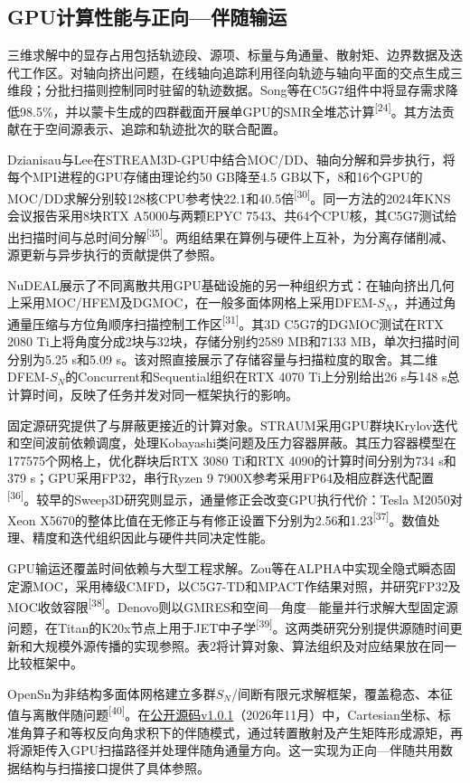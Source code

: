 \documentclass[UTF8, zihao=-4, fontset=none, a4paper]{ctexart}
\newcommand{\upcite}[1]{\textsuperscript{[#1]}}
\begin{document}
\subsection{GPU计算性能与正向---伴随输运}

三维求解中的显存占用包括轨迹段、源项、标量与角通量、散射矩、边界数据及迭代工作区。对轴向挤出问题，在线轴向追踪利用径向轨迹与轴向平面的交点生成三维段；分批扫描则控制同时驻留的轨迹数据。Song等在C5G7组件中将显存需求降低98.5\%，并以蒙卡生成的四群截面开展单GPU的SMR全堆芯计算\upcite{24}。其方法贡献在于空间源表示、追踪和轨迹批次的联合配置。

Dzianisau与Lee在STREAM3D-GPU中结合MOC/DD、轴向分解和异步执行，将每个MPI进程的GPU存储由理论约50 GB降至4.5 GB以下，8和16个GPU的MOC/DD求解分别较128核CPU参考快22.1和40.5倍\upcite{30}。同一方法的2024年KNS会议报告采用8块RTX A5000与两颗EPYC 7543、共64个CPU核，其C5G7测试给出扫描时间与总时间分解\upcite{35}。两组结果在算例与硬件上互补，为分离存储削减、源更新与异步执行的贡献提供了参照。

NuDEAL展示了不同离散共用GPU基础设施的另一种组织方式：在轴向挤出几何上采用MOC/HFEM及DGMOC，在一般多面体网格上采用DFEM-\(S_{N}\)，并通过角通量压缩与方位角顺序扫描控制工作区\upcite{31}。其3D C5G7的DGMOC测试在RTX 2080 Ti上将角度分成2块与32块，存储分别约2589 MB和7133 MB，单次扫描时间分别为5.25 s和5.09 s。该对照直接展示了存储容量与扫描粒度的取舍。其二维DFEM-\(S_{N}\)的Concurrent和Sequential组织在RTX 4070 Ti上分别给出26 s与148 s总计算时间，反映了任务并发对同一框架执行的影响。

固定源研究提供了与屏蔽更接近的计算对象。STRAUM采用GPU群块Krylov迭代和空间波前依赖调度，处理Kobayashi类问题及压力容器屏蔽。其压力容器模型在177575个网格上，优化群块后RTX 3080 Ti和RTX 4090的计算时间分别为734 s和379 s；GPU采用FP32，串行Ryzen 9 7900X参考采用FP64及相应群迭代配置\upcite{36}。较早的Sweep3D研究则显示，通量修正会改变GPU执行代价：Tesla M2050对Xeon X5670的整体比值在无修正与有修正设置下分别为2.56和1.23\upcite{37}。数值处理、精度和迭代组织因此与硬件共同决定性能。

GPU输运还覆盖时间依赖与大型工程求解。Zou等在ALPHA中实现全隐式瞬态固定源MOC，采用棒级CMFD，以C5G7-TD和MPACT作结果对照，并研究FP32及MOC收敛容限\upcite{38}。Denovo则以GMRES和空间---角度---能量并行求解大型固定源问题，在Titan的K20x节点上用于JET中子学\upcite{39}。这两类研究分别提供源随时间更新和大规模外源传播的实现参照。表2将计算对象、算法组织及对应结果放在同一比较框架中。

OpenSn为非结构多面体网格建立多群\(S_{N}\)/间断有限元求解框架，覆盖稳态、本征值与离散伴随问题\upcite{40}。在\href{https://github.com/Open-Sn/opensn/tree/f903a0d71cb8d130dc104f85d9d9ae66fd79146b}{公开源码v1.0.1}（2026年11月）中，Cartesian坐标、标准角算子和等权反向角求积下的伴随模式，通过转置散射及产生矩阵形成源矩，再将源矩传入GPU扫描路径并处理伴随角通量方向。这一实现为正向---伴随共用数据结构与扫描接口提供了具体参照。
\end{document}
